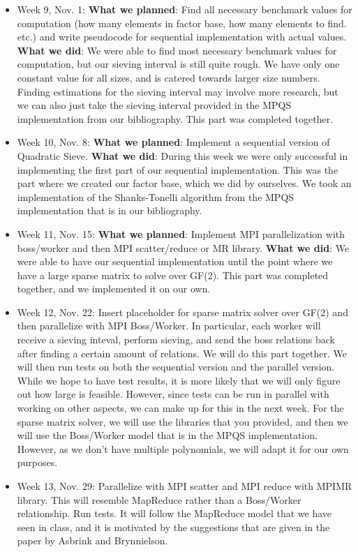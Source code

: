 \documentclass[11pt]{article}
\begin{document}
\begin{itemize}
 \item Week 9, Nov. 1: \textbf{What we planned}: Find all necessary benchmark values for computation (how many elements in factor base, how many elements to find. etc.) and write pseudocode for sequential implementation with actual values. \textbf{What we did}: We were able to find most necessary benchmark values for computation, but our sieving interval is still quite rough. We have only one constant value for all sizes, and is catered towards larger size numbers. Finding estimations for the sieving interval may involve more research, but we can also just take the sieving interval provided in the MPQS implementation from our bibliography. This part was completed together.
 \item Week 10, Nov. 8: \textbf{What we planned}: Implement a sequential version of Quadratic Sieve. \textbf{What we did}: During this week we were only successful in implementing the first part of our sequential implementation. This was the part where we created our factor base, which we did by ourselves. We took an implementation of the Shanks-Tonelli algorithm from the MPQS implementation that is in our bibliography. 
 \item Week 11, Nov. 15: \textbf{What we planned}: Implement MPI parallelization with boss/worker and then MPI scatter/reduce or MR library. \textbf{What we did}: We were able to have our sequential implementation until the point where we have a large sparse matrix to solve over GF(2). This part was completed together, and we implemented it on our own. 
 \item Week 12, Nov. 22: Insert placeholder for sparse matrix solver over GF(2) and then parallelize with MPI Boss/Worker. In particular, each worker will receive a sieving inteval, perform sieving, and send the boss relations back after finding a certain amount of relations. We will do this part together. We will then run tests on both the sequential version and the parallel version. While we hope to have test results, it is more likely that we will only figure out how large is feasible. However, since tests can be run in parallel with working on other aspects, we can make up for this in the next week. For the sparse matrix solver, we will use the libraries that you provided, and then we will use the Boss/Worker model that is in the MPQS implementation. However, as we don't have multiple polynomials, we will adapt it for our own purposes. 
 \item Week 13, Nov. 29: Parallelize with MPI scatter and MPI reduce with MPIMR library. This will resemble MapReduce rather than a Boss/Worker relationship. Run tests. It will follow the MapReduce model that we have seen in class, and it is motivated by the suggestions that are given in the paper by Asbrink and Brynnielson.

\end{itemize}
\end{document}
